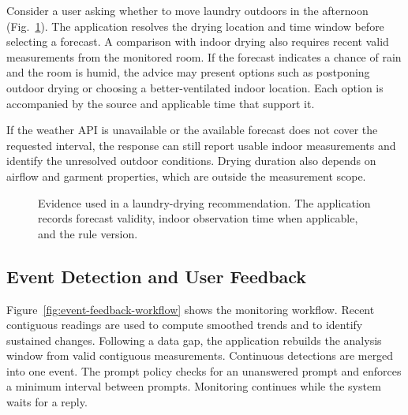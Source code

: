 \documentclass[conference]{IEEEtran}
\begin{document}
Consider a user asking whether to move laundry outdoors in the afternoon (Fig.~\ref{fig:laundry-evidence}). The application resolves the drying location and time window before selecting a forecast. A comparison with indoor drying also requires recent valid measurements from the monitored room. If the forecast indicates a chance of rain and the room is humid, the advice may present options such as postponing outdoor drying or choosing a better-ventilated indoor location. Each option is accompanied by the source and applicable time that support it.

If the weather API is unavailable or the available forecast does not cover the requested interval, the response can still report usable indoor measurements and identify the unresolved outdoor conditions. Drying duration also depends on airflow and garment properties, which are outside the measurement scope.

\begin{figure}[t]
\centering
{}
\caption{Evidence used in a laundry-drying recommendation. The application records forecast validity, indoor observation time when applicable, and the rule version.}
\label{fig:laundry-evidence}
\end{figure}

\subsection{Event Detection and User Feedback}
Figure~\ref{fig:event-feedback-workflow} shows the monitoring workflow. Recent contiguous readings are used to compute smoothed trends and to identify sustained changes. Following a data gap, the application rebuilds the analysis window from valid contiguous measurements. Continuous detections are merged into one event. The prompt policy checks for an unanswered prompt and enforces a minimum interval between prompts. Monitoring continues while the system waits for a reply.
\end{document}
